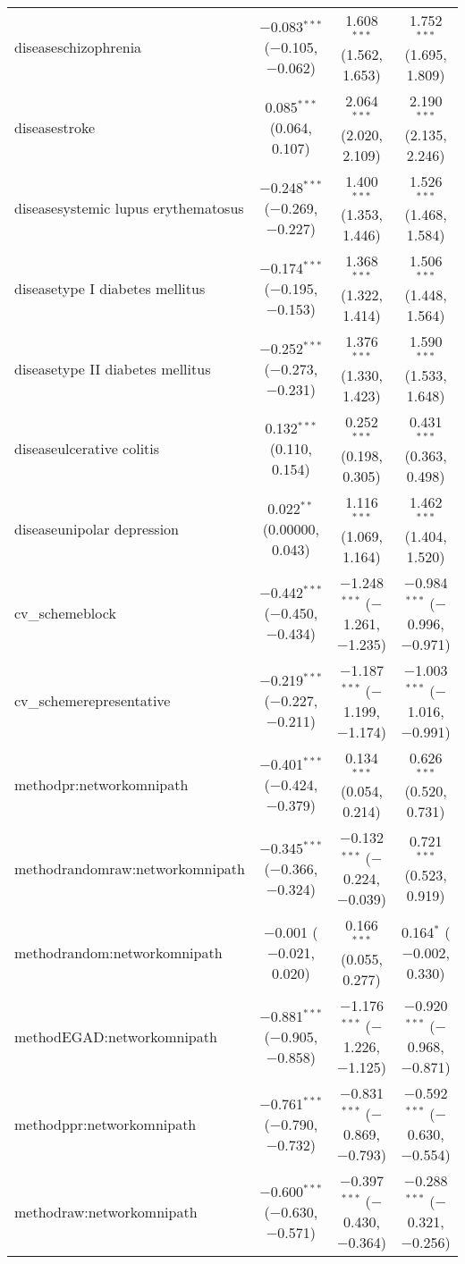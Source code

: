 \begin{table}[!htbp]
\begin{tabular}{@{\extracolsep{5pt}}lccc}
  diseaseschizophrenia & $-$0.083$^{***}$ ($-$0.105, $-$0.062) & 1.608$^{***}$ (1.562, 1.653) & 1.752$^{***}$ (1.695, 1.809) \\ 
  diseasestroke & 0.085$^{***}$ (0.064, 0.107) & 2.064$^{***}$ (2.020, 2.109) & 2.190$^{***}$ (2.135, 2.246) \\ 
  diseasesystemic lupus erythematosus & $-$0.248$^{***}$ ($-$0.269, $-$0.227) & 1.400$^{***}$ (1.353, 1.446) & 1.526$^{***}$ (1.468, 1.584) \\ 
  diseasetype I diabetes mellitus & $-$0.174$^{***}$ ($-$0.195, $-$0.153) & 1.368$^{***}$ (1.322, 1.414) & 1.506$^{***}$ (1.448, 1.564) \\ 
  diseasetype II diabetes mellitus & $-$0.252$^{***}$ ($-$0.273, $-$0.231) & 1.376$^{***}$ (1.330, 1.423) & 1.590$^{***}$ (1.533, 1.648) \\ 
  diseaseulcerative colitis & 0.132$^{***}$ (0.110, 0.154) & 0.252$^{***}$ (0.198, 0.305) & 0.431$^{***}$ (0.363, 0.498) \\ 
  diseaseunipolar depression & 0.022$^{**}$ (0.00000, 0.043) & 1.116$^{***}$ (1.069, 1.164) & 1.462$^{***}$ (1.404, 1.520) \\ 
  cv\_schemeblock & $-$0.442$^{***}$ ($-$0.450, $-$0.434) & $-$1.248$^{***}$ ($-$1.261, $-$1.235) & $-$0.984$^{***}$ ($-$0.996, $-$0.971) \\ 
  cv\_schemerepresentative & $-$0.219$^{***}$ ($-$0.227, $-$0.211) & $-$1.187$^{***}$ ($-$1.199, $-$1.174) & $-$1.003$^{***}$ ($-$1.016, $-$0.991) \\ 
  methodpr:networkomnipath & $-$0.401$^{***}$ ($-$0.424, $-$0.379) & 0.134$^{***}$ (0.054, 0.214) & 0.626$^{***}$ (0.520, 0.731) \\ 
  methodrandomraw:networkomnipath & $-$0.345$^{***}$ ($-$0.366, $-$0.324) & $-$0.132$^{***}$ ($-$0.224, $-$0.039) & 0.721$^{***}$ (0.523, 0.919) \\ 
  methodrandom:networkomnipath & $-$0.001 ($-$0.021, 0.020) & 0.166$^{***}$ (0.055, 0.277) & 0.164$^{*}$ ($-$0.002, 0.330) \\ 
  methodEGAD:networkomnipath & $-$0.881$^{***}$ ($-$0.905, $-$0.858) & $-$1.176$^{***}$ ($-$1.226, $-$1.125) & $-$0.920$^{***}$ ($-$0.968, $-$0.871) \\ 
  methodppr:networkomnipath & $-$0.761$^{***}$ ($-$0.790, $-$0.732) & $-$0.831$^{***}$ ($-$0.869, $-$0.793) & $-$0.592$^{***}$ ($-$0.630, $-$0.554) \\ 
  methodraw:networkomnipath & $-$0.600$^{***}$ ($-$0.630, $-$0.571) & $-$0.397$^{***}$ ($-$0.430, $-$0.364) & $-$0.288$^{***}$ ($-$0.321, $-$0.256) \\ 

\end{tabular}
\end{table}
